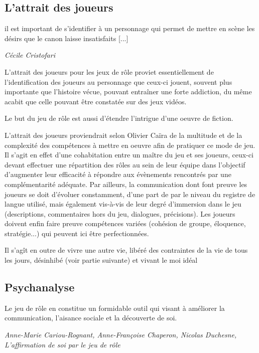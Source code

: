 
\subsection{L'attrait des joueurs}
\begin{shadequote}
[...] il est important de s’identifier à un personnage qui permet de mettre en scène les désirs que le canon laisse insatisfaits [...]
\par\emph{C{\'e}cile Cristofari}
\end{shadequote}

L'attrait des joueurs pour les jeux de rôle proviet essentiellement de l'identification des joueurs au personnage que ceux-ci jouent, souvent plus importante que l'histoire vécue, pouvant entraîner une forte addiction, du même acabit que celle pouvant être constatée sur des jeux vidéos.

Le but du jeu de rôle est aussi d'étendre l'intrigue d'une oeuvre de fiction.

L'attrait des joueurs proviendrait selon Olivier Caïra\cite{caira2007jeux} de la multitude et de la complexité des compétences à mettre en oeuvre afin de pratiquer ce mode de jeu. Il s'agit en effet d'une cohabitation entre un maître du jeu et ses joueurs, ceux-ci devant effectuer une répartition des rôles au sein de leur équipe dans l'objectif d'augmenter leur efficacité à répondre aux évènements rencontrés par une complémentarité adéquate. Par ailleurs, la communication dont font preuve les joueurs se doit d'évoluer constamment, d'une part de par le niveau du registre de langue utilisé, mais également vis-à-vis de leur degré d'immersion dans le jeu (descriptions, commentaires hors du jeu, dialogues, précisions). Les joueurs doivent enfin faire preuve compétences variées (cohésion de groupe, éloquence, stratégie...) qui peuvent ici être perfectionnées.

Il s'agît en outre de vivre une autre vie, libéré des contraintes de la vie de tous les jours, désinhibé (voir partie suivante) et vivant le moi idéal

\subsection{Psychanalyse}
\begin{shadequote}
Le jeu de rôle en constitue un formidable outil qui visant à améliorer la communication, l'aisance sociale et la découverte de soi.
\par\emph{Anne-Marie Cariou-Rognant, Anne-Françoise Chaperon, Nicolas Duchesne, L'affirmation de soi par le jeu de rôle}
\end{shadequote}

